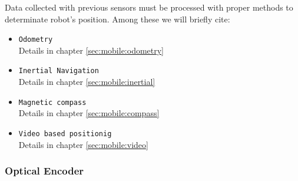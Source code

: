 Data collected with previous sensors must be processed with proper methods to
determinate robot's position. Among these we will briefly cite: 
\begin{itemize}
\item \texttt{Odometry} \\
  Details in chapter \ref{sec:mobile:odometry}
\item \texttt{Inertial Navigation} \\
  Details in chapter \ref{sec:mobile:inertial}
\item \texttt{Magnetic compass} \\
  Details in chapter \ref{sec:mobile:compass}

\item \texttt{Video based positionig} \\
  Details in chapter \ref{sec:mobile:video}
\end{itemize}


\subsubsection{Optical Encoder}
\label{sec:mobile:encoder}


